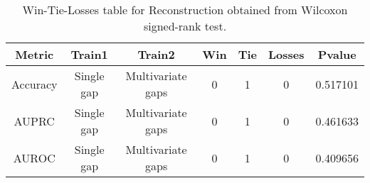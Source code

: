 \begin{table}[H]
\centering
\begin{tabular}{|c|c|c|c|c|c|c|}

\textbf{Metric} & \textbf{Train1} &    \textbf{Train2} &  \textbf{Win} &  \textbf{Tie} &  \textbf{Losses} &  \textbf{Pvalue} \\
\hline

       Accuracy &      Single gap &  Multivariate gaps &             0 &             1 &                0 &         0.517101 \\
\hline
          AUPRC &      Single gap &  Multivariate gaps &             0 &             1 &                0 &         0.461633 \\
\hline
          AUROC &      Single gap &  Multivariate gaps &             0 &             1 &                0 &         0.409656 \\
\hline

\end{tabular}
\caption{Win-Tie-Losses table for Reconstruction obtained from Wilcoxon signed-rank test.}
\label{tab:reconstruction_training_data_comparison}
\end{table}
